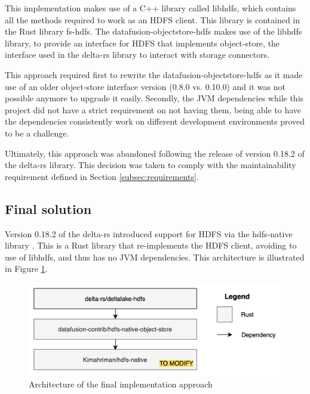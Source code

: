 This implementation makes use of a C++ library called libhdfs, which contains all the methods required to work as an \gls{HDFS} client. This library is contained in the Rust library fs-hdfs. The datafusion-objectstore-hdfs makes use of the libhdfs library, to provide an interface for \gls{HDFS} that implements object-store, the interface used in the delta-rs library to interact with storage connectors.

This approach required first to rewrite the datafusion-objectstore-hdfs as it made use of an older object-store interface version (0.8.0 vs. 0.10.0) and it was not possible anymore to upgrade it easily. Secondly, the \gls{JVM} dependencies while this project did not have a strict requirement on not having them, being able to have the dependencies consistently work on different development environments proved to be a challenge. 

Ultimately, this approach was abandoned following the release of version 0.18.2 of the delta-rs library. This decision was taken to comply with the maintainability requirement defined in Section \ref{subsec:requirements}.

\subsection{Final solution}

Version 0.18.2 of the delta-rs introduced support for \gls{HDFS} via the hdfs-native library \cite{binfordKimahrimanHdfsnative2024}. This is a Rust library that re-implements the \gls{HDFS} client, avoiding to use of libhdfs, and thus has no \gls{JVM} dependencies. This architecture is illustrated in Figure \ref{fig:approach_2_solution_schema}.

\begin{figure}[!ht]
  \begin{center}
    \includegraphics[width=\textwidth]{figures/4-implementation/hdfs-native.png}
  \caption{Architecture of the final implementation approach}
  \label{fig:approach_2_solution_schema}
  \end{center}
\end{figure}

